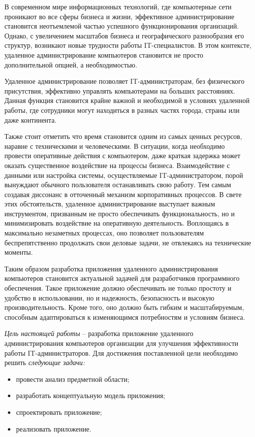 \newsection
{}

В современном мире информационных технологий, где компьютерные сети проникают во все сферы бизнеса и жизни, эффективное администрирование становится неотъемлемой частью успешного функционирования организаций. Однако, с увеличением масштабов бизнеса и географического разнообразия его структур, возникают новые трудности работы IT-специалистов. В этом контексте, удаленное администрирование компьютеров становится не просто дополнительной опцией, а необходимостью.

Удаленное администрирование позволяет IT-администраторам, без физического присутствия, эффективно управлять компьютерами на больших расстояниях. Данная функция становится крайне важной и необходимой в условиях удаленной работы, где сотрудники могут находиться в разных частях города, страны или даже континента.

Также стоит отметить что время становится одним из самых ценных ресурсов, наравне с техническими и человеческими. В ситуации, когда необходимо провести оперативные действия с компьютером, даже краткая задержка может оказать существенное воздействие на процессы бизнеса. Взаимодействие с данными или настройка системы, осуществляемые IT-администратором, порой вынуждают обычного пользователя останавливать свою работу. Тем самым создавая диссонанс в отточенный механизм корпоративных процессов. В свете этих обстоятельств, удаленное администрирование выступает важным инструментом, призванным не просто обеспечивать функциональность, но и минимизировать воздействие на оперативную деятельность. Воплощаясь в максимально незаметных процессах, оно позволяет пользователям беспрепятственно продолжать свои деловые задачи, не отвлекаясь на технические моменты.

Таким образом разработка приложения удаленного администрирования компьютеров становится актуальной задачей для разработчиков программного обеспечения. Такое приложение должно обеспечивать не только простоту и удобство в использовании, но и надежность, безопасность и высокую производительность. Кроме того, оно должно быть гибким и масштабируемым, способным адаптироваться к изменяющимся потребностям и условиям бизнеса.

\emph{Цель настоящей работы} – разработка приложение удаленного администрирования компьютеров организации для улучшения эффективности работы IT-администраторов. Для достижения поставленной цели необходимо решить \emph{следующие задачи:}
\begin{itemize}
\item провести анализ предметной области;
\item разработать концептуальную модель приложения;
\item спроектировать приложение;
\item реализовать приложение.
\end{itemize}

